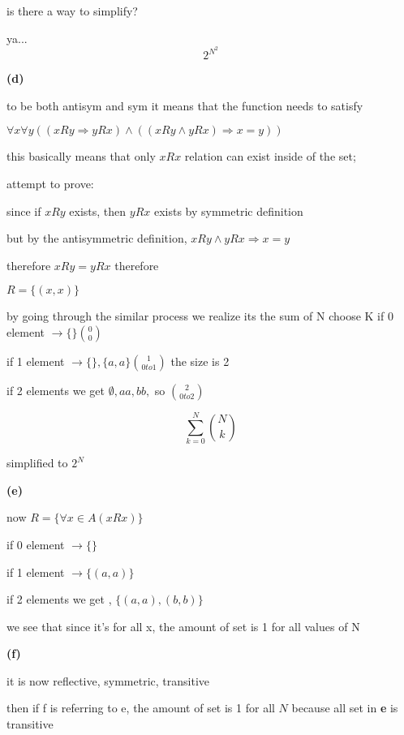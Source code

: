 \documentclass[12pts,A4]{article}
\begin{document}
\begin{flushleft}
    is there a way to simplify?

    ya... $$ 2^{N^2} $$



    \textbf{(d)}
    
    to be both antisym and sym it means that the function needs to satisfy

    $ \forall x \forall y ((xRy \Rightarrow yRx) \wedge ((xRy \wedge yRx) \Rightarrow x = y ))$ 

    this basically means that only $xRx$ relation can exist inside of the set;
    
    attempt to prove:

    since if $xRy$ exists, then $yRx$ exists by symmetric definition
    
    but by the antisymmetric definition, $xRy \wedge yRx \Rightarrow  x = y$

    therefore $xRy = yRx$ therefore

    $ R = \{(x,x)\} $

    \bigskip

    by going through the similar process we realize its the sum of N choose K
    if 0 element $\rightarrow \{\} \binom{0}{0}$

    if 1 element $\rightarrow \{\} , \{a,a\} \binom{1} {0 to 1} $ the size is 2

    if 2 elements we get $ \emptyset , aa ,  bb, $ so $ \binom{2} {0 to 2} $ 

    $$\sum_{k=0}^{N} \binom{N} {k} $$ 
   
    simplified to $ 2 ^{N}$
    
    \bigskip

    \textbf{(e)}
    
    now $ R = \{  \forall x \in A ( xRx ) \} $ 

    if 0 element $\rightarrow \{\}$

    if 1 element $\rightarrow  \{(a,a)\}$ 

    if 2 elements we get , $\{ (a,a),(b,b) \}$

    we see that since it's for all x, the amount of set is 1 for all values of N 

   \bigskip

   \pagebreak

    \textbf{(f)}
    

    it is now reflective, symmetric, transitive
    
    then if f is referring to e, the amount of set is 1 for all $N$ because all set in \textbf{e} is transitive


\end{flushleft}
\end{document}
